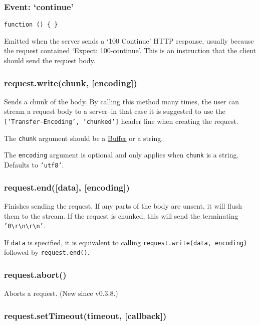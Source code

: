 \subsubsection{Event: `continue'}\label{event-continue}

\texttt{function () \{ \}}

Emitted when the server sends a `100 Continue' HTTP response, usually
because the request contained `Expect: 100-continue'. This is an
instruction that the client should send the request body.

\subsubsection{request.write(chunk,
{[}encoding{]})}\label{request.writechunk-encoding}

Sends a chunk of the body. By calling this method many times, the user
can stream a request body to a server--in that case it is suggested to
use the \texttt{{[}'Transfer-Encoding', 'chunked'{]}} header line when
creating the request.

The \texttt{chunk} argument should be a
\href{buffer.html\#buffer_buffer}{Buffer} or a string.

The \texttt{encoding} argument is optional and only applies when
\texttt{chunk} is a string. Defaults to \texttt{'utf8'}.

\subsubsection{request.end({[}data{]},
{[}encoding{]})}\label{request.enddata-encoding}

Finishes sending the request. If any parts of the body are unsent, it
will flush them to the stream. If the request is chunked, this will send
the terminating
\texttt{'0\textbackslash{}r\textbackslash{}n\textbackslash{}r\textbackslash{}n'}.

If \texttt{data} is specified, it is equivalent to calling
\texttt{request.write(data, encoding)} followed by
\texttt{request.end()}.

\subsubsection{request.abort()}\label{request.abort}

Aborts a request. (New since v0.3.8.)

\subsubsection{request.setTimeout(timeout,
{[}callback{]})}\label{request.settimeouttimeout-callback}

